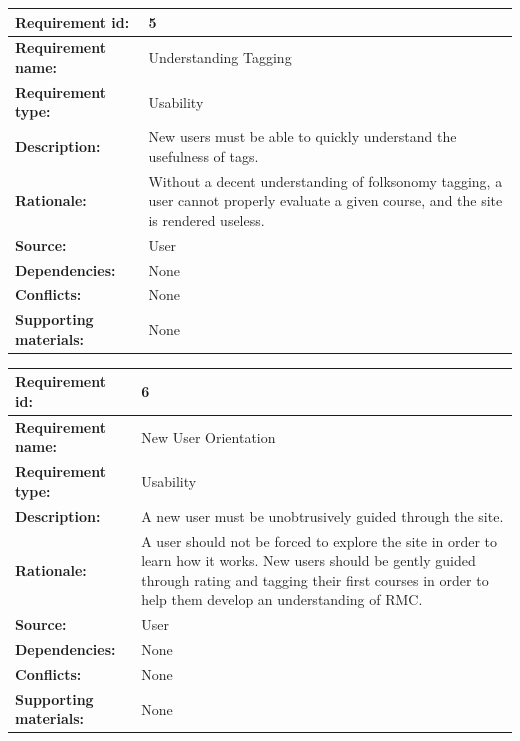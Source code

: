 \documentclass[12pt]{report}
\begin{document}
\begin{tabular}{|l|p{7.5cm}|}
\hline
\textbf{Requirement id:}	& 5 \\
\hline
\textbf{Requirement name:}	&  Understanding Tagging \\
\hline
\textbf{Requirement type:}	& Usability \\
\hline
\textbf{Description:}	&  New users must be able to quickly understand the usefulness of tags. \\
\hline
\textbf{Rationale:}	&  Without a decent understanding of folksonomy tagging, a user cannot properly evaluate a given course, and the site is rendered useless. \\
\hline
\textbf{Source:}	& User \\
\hline
\textbf{Dependencies:}	& None \\
\hline
\textbf{Conflicts:}	& None \\
\hline
\textbf{Supporting materials:}	& None \\
\hline
\end{tabular}

\bigskip

\begin{tabular}{|l|p{7.5cm}|}
\hline
\textbf{Requirement id:}	& 6 \\
\hline
\textbf{Requirement name:}	&  New User Orientation \\
\hline
\textbf{Requirement type:}	& Usability \\
\hline
\textbf{Description:}	&  A new user must be unobtrusively guided through the site. \\
\hline
\textbf{Rationale:}	&  A user should not be forced to explore the site in order to learn how it works. New users should be gently guided through rating and tagging their first courses in order to help them develop an understanding of RMC. \\
\hline
\textbf{Source:}	& User \\
\hline
\textbf{Dependencies:}	& None \\
\hline
\textbf{Conflicts:}	& None \\
\hline
\textbf{Supporting materials:}	& None \\
\hline
\end{tabular}

\bigskip
\end{document}
